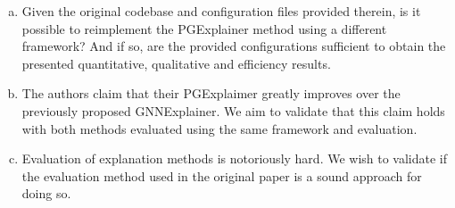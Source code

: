 \documentclass{article}
\begin{document}
\begin{enumerate}[(a)]
    \item Given the original codebase and configuration files provided therein, is it possible to reimplement the PGExplainer method using a different framework? And if so, are the provided configurations sufficient to obtain the presented quantitative, qualitative and efficiency results. 
    \item The authors claim that their PGExplaimer greatly improves over the previously proposed GNNExplainer. We aim to validate that this claim holds with both methods evaluated using the same framework and evaluation. 
    \item Evaluation of explanation methods is notoriously hard. We wish to validate if the evaluation method used in the original paper is a sound approach for doing so.
\end{enumerate}



\end{document}
